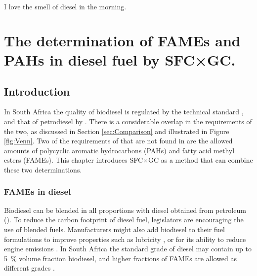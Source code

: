
\begin{savequote}[\quotewidth]
I love the smell of diesel in the morning.
\end{savequote}

\chapter{The determination of FAMEs and PAHs in diesel fuel by SFC×GC.} %
\label{Chapter7} %

\section{Introduction}

In South Africa the quality of biodiesel is regulated by the technical standard
, and that of petrodiesel by . There is a
considerable overlap in the requirements of the two, as discussed in Section
\ref{sec:Comparison} and illustrated in Figure \ref{fig:Venn}. Two of the
requirements of  that are not found in  are the
allowed amounts of polycyclic aromatic hydrocarbons (PAHs) and fatty acid methyl
esters (FAMEs). This chapter  introduces SFC×GC as a method that can combine
these two determinations.

\subsection{FAMEs in diesel}

Biodiesel can be blended in all proportions with diesel obtained from petroleum
(). To reduce the carbon footprint of diesel fuel,
legislators are encouraging the use of blended fuels. Manufacturers might also
add biodiesel to their fuel formulations to improve properties such as lubricity
\autocite{Knothe2005}, or for its ability to reduce engine emissions
\autocite{Wattrus2016}. In South Africa the standard grade of diesel may contain
up to \SI{5}{\percent} volume fraction biodiesel, and higher fractions of FAMEs
are allowed as different grades \autocite{Act120-1997}.


